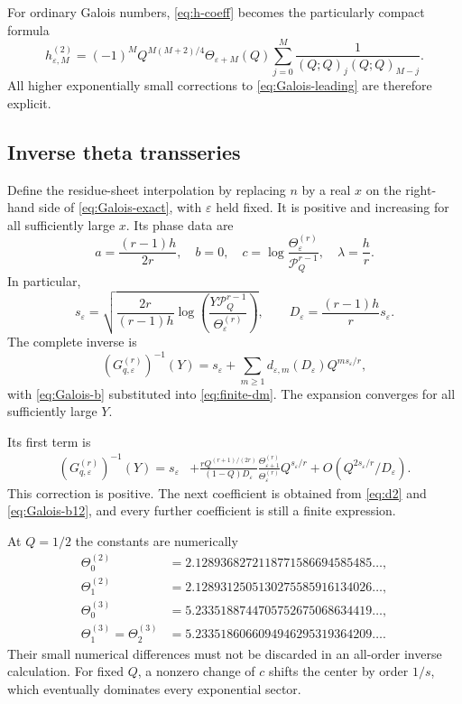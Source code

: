 \documentclass[11pt]{article}
\numberwithin{equation}{section}
\theoremstyle{definition}
\newcommand{\pp}[1]{(Q;Q)_{#1}}
\newcommand{\Pinf}{\mathcal P_Q}
\newcommand{\eps}{\varepsilon}
\newcommand{\T}{\Theta}
\begin{document}
For ordinary Galois numbers, \eqref{eq:h-coeff} becomes the particularly compact formula
\begin{equation}\label{eq:H-r2}
 h_{\eps,M}^{(2)}=(-1)^M Q^{M(M+2)/4}\T_{\eps+M}(Q)
     \sum_{j=0}^M\frac1{\pp{j}\pp{M-j}}.
\end{equation}
All higher exponentially small corrections to \eqref{eq:Galois-leading} are therefore explicit.

\subsection{Inverse theta transseries}

Define the residue-sheet interpolation by replacing $n$ by a real $x$ on the right-hand side of \eqref{eq:Galois-exact}, with $\eps$ held fixed. It is positive and increasing for all sufficiently large $x$. Its phase data are
\begin{equation}\label{eq:Galois-phase}
 a=\frac{(r-1)h}{2r},\quad b=0,\quad
 c=\log\frac{\T_{\eps}^{(r)}}{\Pinf^{r-1}},\quad
 \lambda=\frac hr.
\end{equation}
In particular,
\begin{equation}\label{eq:Galois-center}
 s_{\eps}=\sqrt{\frac{2r}{(r-1)h}
       \log\left(\frac{Y\Pinf^{r-1}}{\T_{\eps}^{(r)}}\right)},
 \qquad D_{\eps}=\frac{(r-1)h}{r}s_{\eps}.
\end{equation}
The complete inverse is
\begin{equation}\label{eq:Galois-inverse-full}
 \boxed{\displaystyle
 (G_{q,\eps}^{(r)})^{-1}(Y)
 =s_{\eps}+\sum_{m\ge1}d_{\eps,m}(D_{\eps})Q^{ms_{\eps}/r},}
\end{equation}
with \eqref{eq:Galois-b} substituted into \eqref{eq:finite-dm}. The expansion converges for all sufficiently large $Y$.

Its first term is
\begin{align}\label{eq:Galois-first}
 (G_{q,\eps}^{(r)})^{-1}(Y)=s_{\eps}
 &+\frac{rQ^{(r+1)/(2r)}}{(1-Q)D_{\eps}}
     \frac{\T_{\eps+1}^{(r)}}{\T_{\eps}^{(r)}}
      Q^{s_{\eps}/r}
 +O(Q^{2s_{\eps}/r}/D_{\eps}).
\end{align}
This correction is positive. The next coefficient is obtained from \eqref{eq:d2} and \eqref{eq:Galois-b12}, and every further coefficient is still a finite expression.

At $Q=1/2$ the constants are numerically
\begin{align*}
 \T_0^{(2)}&=2.1289368272118771586694585485\ldots,\\
 \T_1^{(2)}&=2.1289312505130275585916134026\ldots,\\
 \T_0^{(3)}&=5.2335188744705752675068634419\ldots,\\
 \T_1^{(3)}=\T_2^{(3)}&=5.2335186066094946295319364209\ldots.
\end{align*}
Their small numerical differences must not be discarded in an all-order inverse calculation. For fixed $Q$, a nonzero change of $c$ shifts the center by order $1/s$, which eventually dominates every exponential sector.
\end{document}
